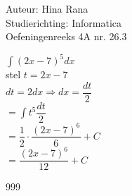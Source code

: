 \documentclass[a4paper]{article}
\newcommand{\dint}{\displaystyle\int}
\begin{document}
\noindent \large Auteur: Hina Rana \\
\noindent \large Studierichting: Informatica\\
\noindent \large Oefeningenreeks 4A nr. 26.3\\

\medskip

\normalsize

$ \dint (2x-7)^5 dx $\\

stel $t = 2x-7$ \\

$dt = 2dx \Rightarrow dx =\dfrac {dt}{2}$\\

$ = \dint t^5 \dfrac {dt}{2}$ \\

$ = \dfrac{1}{2} \cdot \dfrac{(2x-7)^6}{6} + C $\\

$ = \dfrac{(2x-7)^6}{12} + C$
                                  

\begin{thebibliography}{999}
\end{thebibliography}
\end{document}
